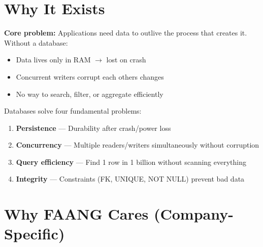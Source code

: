\documentclass[11pt]{article}
\providecommand{\tightlist}{\setlength{\itemsep}{1pt}\setlength{\parskip}{0pt}}
\begin{document}
\section{Why It Exists}\label{why-it-exists}

\textbf{Core problem:} Applications need data to outlive the process that creates it. Without a database:

\begin{itemize}
\tightlist
\item
  Data lives only in RAM \(\rightarrow\) lost on crash
\item
  Concurrent writers corrupt each other\textquotesingle s changes
\item
  No way to search, filter, or aggregate efficiently
\end{itemize}

Databases solve four fundamental problems:

\begin{enumerate}
\def\labelenumi{\arabic{enumi}.}
\tightlist
\item
  \textbf{Persistence} --- Durability after crash/power loss
\item
  \textbf{Concurrency} --- Multiple readers/writers simultaneously without corruption
\item
  \textbf{Query efficiency} --- Find 1 row in 1 billion without scanning everything
\item
  \textbf{Integrity} --- Constraints (FK, UNIQUE, NOT NULL) prevent bad data
\end{enumerate}

\section{Why FAANG Cares (Company-Specific)}\label{why-faang-cares-company-specific}
\end{document}
